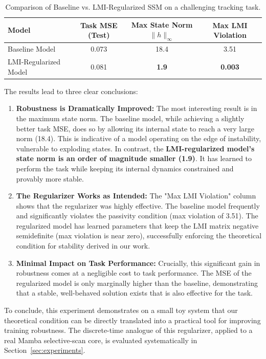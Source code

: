 \documentclass[10pt]{article} %
\theoremstyle{definition}
\begin{document}
\begin{table}[h]
\centering
\caption{Comparison of Baseline vs. LMI-Regularized SSM on a challenging tracking task.}
\label{tab:lmi_results}
\begin{tabular}{@{}lccc@{}}
\toprule
\textbf{Model} & \textbf{Task MSE (Test)} & \textbf{Max State Norm $\|h\|_{\infty}$} & \textbf{Max LMI Violation} \\ \midrule
Baseline Model & 0.073 & 18.4 & 3.51 \\
LMI-Regularized Model & 0.081 & \textbf{1.9} & \textbf{0.003} \\ \bottomrule
\end{tabular}
\end{table}

The results lead to three clear conclusions:
\begin{enumerate}
    \item \textbf{Robustness is Dramatically Improved:} The most interesting result is in the maximum state norm. The baseline model, while achieving a slightly better task MSE, does so by allowing its internal state to reach a very large norm (18.4). This is indicative of a model operating on the edge of instability, vulnerable to exploding states. In contrast, the \textbf{LMI-regularized model's state norm is an order of magnitude smaller (1.9)}. It has learned to perform the task while keeping its internal dynamics constrained and provably more stable.

    \item \textbf{The Regularizer Works as Intended:} The "Max LMI Violation" column shows that the regularizer was highly effective. The baseline model frequently and significantly violates the passivity condition (max violation of 3.51). The regularized model has learned parameters that keep the LMI matrix negative semidefinite (max violation is near zero), successfully enforcing the theoretical condition for stability derived in our work.

    \item \textbf{Minimal Impact on Task Performance:} Crucially, this significant gain in robustness comes at a negligible cost to task performance. The MSE of the regularized model is only marginally higher than the baseline, demonstrating that a stable, well-behaved solution exists that is also effective for the task.
\end{enumerate}

To conclude, this experiment demonstrates on a small toy system that our theoretical condition can be directly translated into a practical tool for improving training robustness. The discrete-time analogue of this regularizer, applied to a real Mamba selective-scan core, is evaluated systematically in Section~\ref{sec:experiments}.
\end{document}

